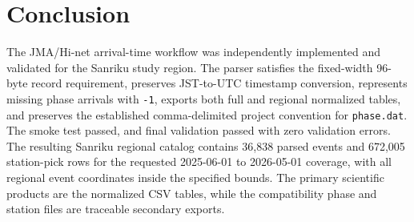 \documentclass[11pt]{article}
\begin{document}
\section{Conclusion}

The JMA/Hi-net arrival-time workflow was independently implemented and validated for the Sanriku study region.  The parser satisfies the fixed-width 96-byte record requirement, preserves JST-to-UTC timestamp conversion, represents missing phase arrivals with \texttt{-1}, exports both full and regional normalized tables, and preserves the established comma-delimited project convention for \texttt{phase.dat}.  The smoke test passed, and final validation passed with zero validation errors.  The resulting Sanriku regional catalog contains 36,838 parsed events and 672,005 station-pick rows for the requested 2025-06-01 to 2026-05-01 coverage, with all regional event coordinates inside the specified bounds.  The primary scientific products are the normalized CSV tables, while the compatibility phase and station files are traceable secondary exports.
\end{document}
